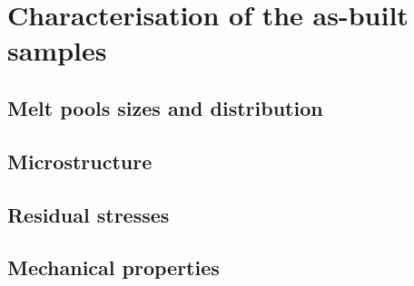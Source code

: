 \section{Characterisation of the as-built samples} 

\subsection{Melt pools sizes and distribution}

\subsection{Microstructure}


\subsection{Residual stresses}

\subsection{Mechanical properties}
 \begin{center}
\begin{table}[ht]
\noindent{}

\caption[Tensile mechanical properties of the as-built specimens from batch X200-180417]{Tensile mechanical properties of the as-built specimens from batch X200-180417}
\label{tab:tracAB}
\end{table}
 \end{center}
